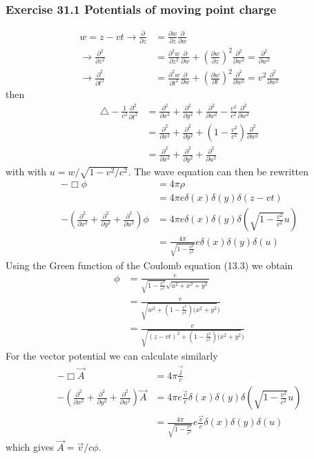 \documentclass[10pt,a4paper]{article}
\theoremstyle{definition}
\begin{document}
\subsubsection{Exercise 31.1 Potentials of moving point charge}
\begin{align}
    w=z-vt
    \rightarrow
    \frac{\partial}{\partial z}&=\frac{\partial w}{\partial z}\frac{\partial}{\partial w}\\
    \rightarrow\frac{\partial^2}{\partial z^2}&=\frac{\partial^2 w}{\partial z^2}\frac{\partial}{\partial w}+\left(\frac{\partial w}{\partial z}\right)^2\frac{\partial^2}{\partial w^2}=\frac{\partial^2}{\partial w^2}\\
    \rightarrow\frac{\partial^2}{\partial t^2}&=\frac{\partial^2 w}{\partial t^2}\frac{\partial}{\partial w}+\left(\frac{\partial w}{\partial t}\right)^2\frac{\partial^2}{\partial w^2}=v^2\frac{\partial^2}{\partial w^2}
\end{align}
then
\begin{align}
    \triangle-\frac{1}{c^2}\frac{\partial^2}{\partial t^2}&=\frac{\partial^2}{\partial x^2}+\frac{\partial^2}{\partial y^2}+\frac{\partial^2}{\partial w^2}-\frac{v^2}{c^2}\frac{\partial^2}{\partial w^2}\\
    &=\frac{\partial^2}{\partial x^2}+\frac{\partial^2}{\partial y^2}+\left(1-\frac{v^2}{c^2}\right)\frac{\partial^2}{\partial w^2}\\
    &=\frac{\partial^2}{\partial x^2}+\frac{\partial^2}{\partial y^2}+\frac{\partial^2}{\partial u^2}
\end{align}
with with $u=w/\sqrt{1-v^2/c^2}$. The wave equation can then be rewritten
\begin{align}
    -\Box\phi&=4\pi\rho\\
    &=4\pi e\delta(x)\delta(y)\delta(z-vt)\\
    -\left(\frac{\partial^2}{\partial x^2}+\frac{\partial^2}{\partial y^2}+\frac{\partial^2}{\partial u^2}\right)\phi&=4\pi e\delta(x)\delta(y)\delta\left(\sqrt{1-\frac{v^2}{c^2}}u\right)\\
    &=\frac{4\pi}{\sqrt{1-\frac{v^2}{c^2}}} e\delta(x)\delta(y)\delta\left(u\right)
\end{align}
Using the Green function of the Coulomb equation (13.3) we obtain
\begin{align}
    \phi&=\frac{e}{\sqrt{1-\frac{v^2}{c^2}}\sqrt{u^2+x^2+y^2}}\\
    &=\frac{e}{\sqrt{w^2+(1-\frac{v^2}{c^2})(x^2+y^2})}\\
    &=\frac{e}{\sqrt{(z-vt)^2+(1-\frac{v^2}{c^2})(x^2+y^2})}
\end{align}
For the vector potential we can calculate similarly
\begin{align}
    -\Box\vec{A}&=4\pi\frac{\vec{j}}{c}\\
    -\left(\frac{\partial^2}{\partial x^2}+\frac{\partial^2}{\partial y^2}+\frac{\partial^2}{\partial u^2}\right)\vec{A}&=4\pi e\frac{\vec{v}}{c}\delta(x)\delta(y)\delta\left(\sqrt{1-\frac{v^2}{c^2}}u\right)\\
    &=\frac{4\pi}{\sqrt{1-\frac{v^2}{c^2}}} e\frac{\vec{v}}{c}\delta(x)\delta(y)\delta\left(u\right)
\end{align}
which gives $\vec{A}=\vec{v}/c\phi$.
\end{document}
